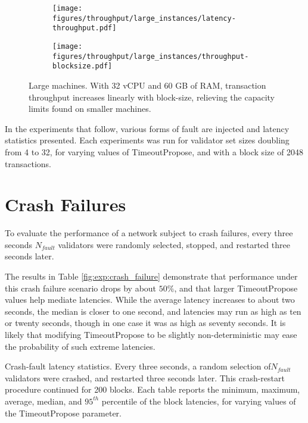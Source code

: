 \begin{figure}[]
	\centering
	\begin{subfigure}{0.8 \textwidth}
		\texttt{[image: figures/throughput/large\_instances/latency-throughput.pdf]}
		\centering
	\end{subfigure}

	\begin{subfigure}{0.8 \textwidth}
		\texttt{[image: figures/throughput/large\_instances/throughput-blocksize.pdf]}
	\end{subfigure}
	\centering
	\caption[Latency-Throughput trade-off in non-faulty global network of large machines]{Large machines.
With 32 vCPU and 60 GB of RAM, transaction throughput increases linearly with block-size, 
relieving the capacity limits found on smaller machines.}
	\label{fig:exp:throughput:large}
\end{figure}

In the experiments that follow, various forms of fault are injected
and latency statistics presented.
Each experiments was run for validator set sizes doubling from 4 to 32, 
for varying values of TimeoutPropose, and with a block size of 2048 transactions.

\section{Crash Failures}

To evaluate the performance of a network subject to crash failures, 
every three seconds $N_{fault}$ validators were randomly selected,
stopped, and restarted three seconds later.

The results in Table \ref{fig:exp:crash_failure} demonstrate that 
performance under this crash failure scenario drops by about 
$50\%$, and that larger TimeoutPropose values help mediate latencies. 
While the average latency increases to about two seconds,
the median is closer to one second, and latencies may run as high as ten or twenty seconds,
though in one case it was as high as seventy seconds.
It is likely that modifying TimeoutPropose to be slightly non-deterministic may
ease the probability of such extreme latencies.

\begin{table}
	
	\caption[Latency statistics under crash faults]{Crash-fault latency statistics. Every three seconds, a random selection of$N_{fault}$ validators were crashed, and restarted three seconds later. This crash-restart procedure continued for 200 blocks. Each table reports the minimum, maximum, average, median, and $95^{th}$ percentile of the block latencies, for varying values of the TimeoutPropose parameter.}
	\label{fig:exp:crash_failure}
\end{table}

